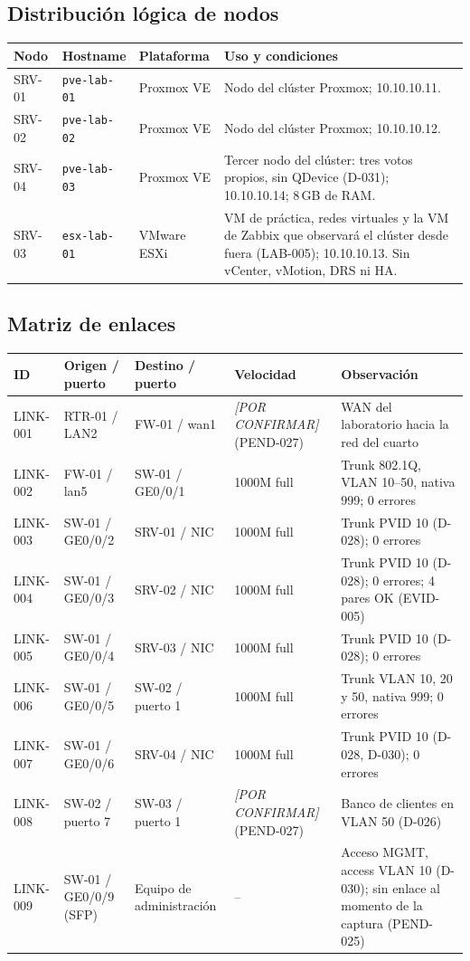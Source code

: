 \documentclass[11pt,a4paper]{article}
\newcommand{\pc}{\textcolor{muted}{\textit{[POR CONFIRMAR]}}}
\begin{document}
\subsection{Distribución lógica de nodos}
\begin{tabularx}{\textwidth}{L{2.0cm} L{2.4cm} L{2.6cm} Z}
  \toprule
  \textbf{Nodo} & \textbf{Hostname} & \textbf{Plataforma} & \textbf{Uso y condiciones}\\
  \midrule
  SRV-01 & \texttt{pve-lab-01} & Proxmox VE & Nodo del clúster Proxmox; 10.10.10.11.\\
  SRV-02 & \texttt{pve-lab-02} & Proxmox VE & Nodo del clúster Proxmox; 10.10.10.12.\\
  SRV-04 & \texttt{pve-lab-03} & Proxmox VE & Tercer nodo del clúster: tres votos propios, sin QDevice (D-031); 10.10.10.14; 8\,GB de RAM.\\
  SRV-03 & \texttt{esx-lab-01} & VMware ESXi & VM de práctica, redes virtuales y la VM de Zabbix que observará el clúster desde fuera (LAB-005); 10.10.10.13. Sin vCenter, vMotion, DRS ni HA.\\
  \bottomrule
\end{tabularx}

\subsection{Matriz de enlaces}
{\small
\begin{tabularx}{\textwidth}{L{1.6cm} L{2.9cm} L{2.9cm} L{2.4cm} Z}
  \toprule
  \textbf{ID} & \textbf{Origen / puerto} & \textbf{Destino / puerto} & \textbf{Velocidad} & \textbf{Observación}\\
  \midrule
  LINK-001 & RTR-01 / LAN2 & FW-01 / wan1 & \pc{} (PEND-027) & WAN del laboratorio hacia la red del cuarto\\
  LINK-002 & FW-01 / lan5 & SW-01 / GE0/0/1 & 1000M full & Trunk 802.1Q, VLAN 10--50, nativa 999; 0 errores\\
  LINK-003 & SW-01 / GE0/0/2 & SRV-01 / NIC & 1000M full & Trunk PVID 10 (D-028); 0 errores\\
  LINK-004 & SW-01 / GE0/0/3 & SRV-02 / NIC & 1000M full & Trunk PVID 10 (D-028); 0 errores; 4 pares OK (EVID-005)\\
  LINK-005 & SW-01 / GE0/0/4 & SRV-03 / NIC & 1000M full & Trunk PVID 10 (D-028); 0 errores\\
  LINK-006 & SW-01 / GE0/0/5 & SW-02 / puerto 1 & 1000M full & Trunk VLAN 10, 20 y 50, nativa 999; 0 errores\\
  LINK-007 & SW-01 / GE0/0/6 & SRV-04 / NIC & 1000M full & Trunk PVID 10 (D-028, D-030); 0 errores\\
  LINK-008 & SW-02 / puerto 7 & SW-03 / puerto 1 & \pc{} (PEND-027) & Banco de clientes en VLAN 50 (D-026)\\
  LINK-009 & SW-01 / GE0/0/9 (SFP) & Equipo de administración & -- & Acceso MGMT, access VLAN 10 (D-030); sin enlace al momento de la captura (PEND-025)\\
  \bottomrule
\end{tabularx}
}
\end{document}

